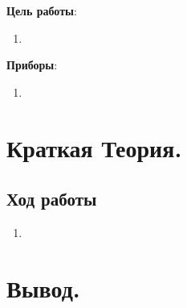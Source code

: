 \documentclass[a4paper,12pt]{article}
\begin{document}

\tableofcontents
\listoffigures
\listoftables

\newpage

\textbf{Цель работы}:
\begin{enumerate}
  \item 
\end{enumerate}

\textbf{Приборы}:
\begin{enumerate}
  \item 
\end{enumerate}

\section{Краткая Теория.}

\subsection{Ход работы}
\begin{enumerate}
  \item
\end{enumerate}

\section{Вывод.}
\end{document}

